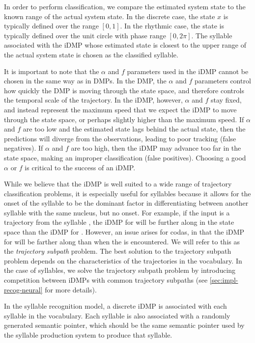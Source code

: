 In order to perform classification,
we compare the estimated system state
to the known range of the actual system state.
In the discrete case,
the state $x$ is typically defined
over the range $[0, 1]$.
In the rhythmic case,
the state is typically defined
over the unit circle
with phase range $[0, 2\pi]$.
The syllable associated with the iDMP
whose estimated state is closest
to the upper range of the actual system state
is chosen as the classified syllable.

It is important to note that
the $\alpha$ and $f$ parameters
used in the iDMP cannot be chosen
in the same way as in DMPs.
In the DMP,
the $\alpha$ and $f$ parameters
control how quickly
the DMP is moving through
the state space,
and therefore controls
the temporal scale
of the trajectory.
In the iDMP, however,
$\alpha$ and $f$ stay fixed,
and instead represent
the maximum speed that
we expect the iDMP to
move through the state space,
or perhaps slightly higher than
the maximum speed.
If $\alpha$ and $f$ are too low
and the estimated state
lags behind the actual state,
then the predictions will
diverge from the observations,
leading to poor tracking
(false negatives).
If $\alpha$ and $f$ are too high,
then the iDMP may advance
too far in the state space,
making an improper classification
(false positives).
Choosing a good $\alpha$ or $f$
is critical to the success of an iDMP.

While we believe that the iDMP
is well suited to a wide range
of trajectory classification problems,
it is especially useful for syllables
because it allows for
the onset of the syllable to
be the dominant factor
in differentiating between
another syllable with the same nucleus,
but no onset.
For example, if the input is a trajectory
from the syllable \ipa{[bAr]},
the iDMP for \ipa{[bAr]}
will be further along in the state space
than the iDMP for \ipa{[Ar]}.
However, an issue arises
for codas,
in that the iDMP for \ipa{[bA]}
will be farther along than
\ipa{[bAr]} when the \ipa{[r]}
is encountered.
We will refer to this as the
\textit{trajectory subpath} problem.
The best solution to the
trajectory subpath problem depends on
the characteristics of the trajectories
in the vocabulary.
In the case of syllables,
we solve the trajectory subpath problem
by introducing competition
between iDMPs with
common trajectory subpaths
(see \ref{sec:impl-recog-neural} for more details).

In the syllable recognition model,
a discrete iDMP is associated
with each syllable in the vocabulary.
Each syllable is also associated
with a randomly generated semantic pointer,
which should be the same semantic pointer
used by the syllable production system
to produce that syllable.

